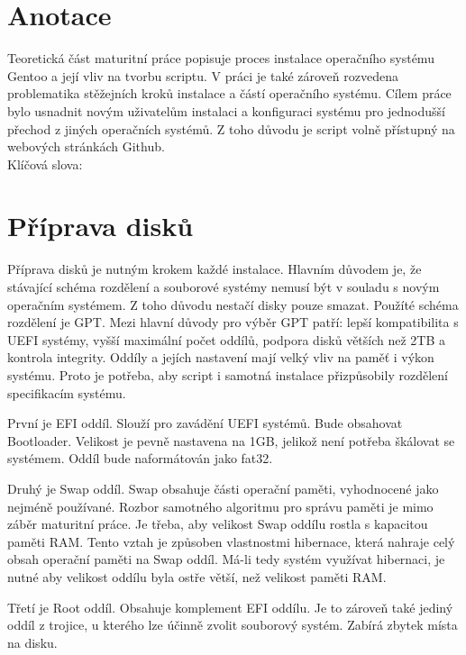 \documentclass[12pt,a4paper,twoside,]{article}
\begin{document}
\newpage
\renewcommand{\contentsname}{\textsf{Obsah}}\tableofcontents

\newpage
\section{\textsf{Anotace}}
{Teoretická část maturitní práce popisuje proces instalace operačního systému Gentoo
	a její vliv na tvorbu scriptu. V práci je také zároveň rozvedena problematika stěžejních
	kroků instalace a částí operačního systému. Cílem práce bylo usnadnit novým uživatelům instalaci a konfiguraci
	systému pro jednodušší přechod z jiných operačních systémů. Z toho důvodu je script volně přístupný na webových stránkách Github. 
	\vspace{2cm}
	\\Klíčová slova:
}


\newpage

\section{\textsf{Příprava disků}}
{Příprava disků je nutným krokem každé instalace. Hlavním důvodem je, 
že stávající schéma rozdělení a souborové systémy nemusí být v souladu s novým operačním systémem. 
Z toho důvodu nestačí disky pouze smazat. Použíté schéma rozdělení je GPT. 
Mezi hlavní důvody pro výběr GPT patří: lepší kompatibilita s UEFI systémy, 
vyšší maximální počet oddílů, podpora disků větších než 2TB a kontrola integrity.
Oddíly a jejích nastavení mají velký vliv na paměť i výkon systému. Proto je potřeba, 
aby script i samotná instalace přizpůsobily rozdělení specifikacím systému.} 

{První je EFI oddíl. Slouží pro zavádění UEFI systémů. Bude obsahovat Bootloader. 
Velikost je pevně nastavena na 1GB, jelikož není potřeba škálovat se systémem.
Oddíl bude naformátován jako fat32.}

{Druhý je Swap oddíl. Swap obsahuje části operační paměti, vyhodnocené jako nejméně používané. 
Rozbor samotného algoritmu pro správu paměti je mimo záběr maturitní práce. Je třeba,
aby velikost Swap oddílu rostla s kapacitou paměti RAM. Tento vztah je způsoben vlastnostmi hibernace, 
která nahraje celý obsah operační paměti na Swap oddíl. Má-li tedy systém využívat hibernaci, je nutné
aby velikost oddílu byla ostře větší, než velikost paměti RAM. }

{Třetí je Root oddíl. Obsahuje komplement EFI oddílu. Je to zároveň také jediný oddíl z trojice, 
u kterého lze účinně zvolit souborový systém. Zabírá zbytek místa na disku.}
\end{document}

